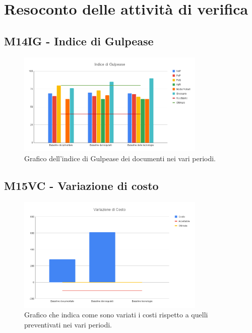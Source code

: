 \section{Resoconto delle attività di verifica}
\subsection{M14IG - Indice di Gulpease}
\begin{figure}[H]
    \centering\includegraphics[width=0.8\textwidth, height=0.8\textheight,keepaspectratio]{images/Indice-di-Gulpease.png}
    \caption{Grafico dell'indice di Gulpease dei documenti nei vari periodi.}
\end{figure}    


\subsection{M15VC - Variazione di costo}
\begin{figure}[H]
    \centering\includegraphics[width=0.8\textwidth, height=0.8\textheight,keepaspectratio]{images/Variazione-di-Costo.png}
    \caption{Grafico che indica come sono variati i costi rispetto a quelli preventivati nei vari periodi.}
\end{figure}    

